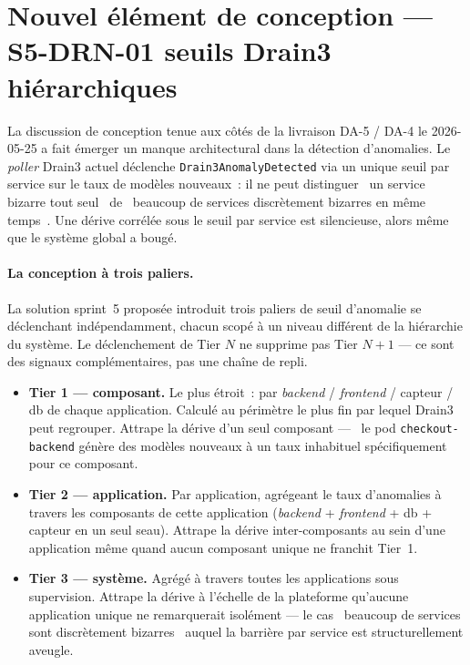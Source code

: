 \documentclass[11pt,a4paper,oneside]{report}
\begin{document}
\section{Nouvel élément de conception --- S5-DRN-01 seuils Drain3 hiérarchiques}
\label{sec:drn-01}

La discussion de conception tenue aux côtés de la livraison
DA-5 / DA-4 le 2026-05-25 a fait émerger un manque architectural
dans la détection d'anomalies. Le \emph{poller} Drain3 actuel
déclenche \texttt{Drain3AnomalyDetected} via un unique seuil par
service sur le taux de modèles nouveaux~: il ne peut distinguer
\og~un service bizarre tout seul~\fg{} de \og~beaucoup de services
discrètement bizarres en même temps~\fg{}. Une dérive corrélée
sous le seuil par service est silencieuse, alors même que le
système global a bougé.

\paragraph{La conception à trois paliers.}
La solution sprint~5 proposée introduit trois paliers de seuil
d'anomalie se déclenchant indépendamment, chacun scopé à un niveau
différent de la hiérarchie du système. Le déclenchement de Tier $N$
ne supprime pas Tier $N+1$ --- ce sont des signaux complémentaires,
pas une chaîne de repli.

\begin{itemize}
  \item \textbf{Tier 1 --- composant.} Le plus étroit~: par
        \emph{backend} / \emph{frontend} / capteur / db de chaque
        application. Calculé au périmètre le plus fin par lequel
        Drain3 peut regrouper. Attrape la dérive d'un seul
        composant --- \og~le pod \texttt{checkout-backend}
        génère des modèles nouveaux à un taux inhabituel
        spécifiquement pour ce composant.~\fg{}
  \item \textbf{Tier 2 --- application.} Par application, agrégeant
        le taux d'anomalies à travers les composants de cette
        application (\emph{backend} + \emph{frontend} + db +
        capteur en un seul seau). Attrape la dérive
        inter-composants au sein d'une application même quand
        aucun composant unique ne franchit Tier~1.
  \item \textbf{Tier 3 --- système.} Agrégé à travers toutes les
        applications sous supervision. Attrape la dérive à
        l'échelle de la plateforme qu'aucune application unique
        ne remarquerait isolément --- le cas \og~beaucoup de
        services sont discrètement bizarres~\fg{} auquel la
        barrière par service est structurellement aveugle.
\end{itemize}
\end{document}
